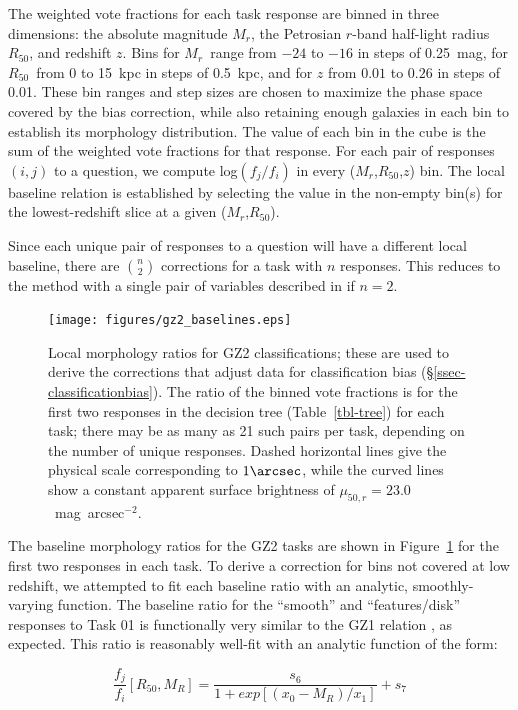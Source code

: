 \documentclass[useAMS,usenatbib]{mn2e}
\newcommand{\mr}{$M_r$}
\newcommand{\rfifty}{$R_{50}$}
\newcommand{\redshift}{$z$}
\begin{document}
The weighted vote fractions for each task response are binned in three dimensions: the absolute magnitude \mr, the Petrosian $r$-band half-light radius \rfifty, and redshift $z$. Bins for \mr~range from $-24$ to $-16$ in steps of 0.25~mag, for \rfifty~from 0 to 15~kpc in steps of 0.5~kpc, and for $z$ from $0.01$ to $0.26$ in steps of 0.01. These bin ranges and step sizes are chosen to maximize the phase space covered by the bias correction, while also retaining enough galaxies in each bin to establish its morphology distribution. The value of each bin in the cube is the sum of the weighted vote fractions for that response. For each pair of responses $(i,j)$ to a question, we compute log$(f_j/f_i)$ in every (\mr,\rfifty,\redshift) bin. The local baseline relation is established by selecting the value in the non-empty bin(s) for the lowest-redshift slice at a given (\mr,\rfifty). 

Since each unique pair of responses to a question will have a different local baseline, there are $\binom{n}{2}$ corrections for a task with $n$ responses. This reduces to the method with a single pair of variables described in \citet{bam09} if $n=2$. 

\begin{figure}
\texttt{[image: figures/gz2\_baselines.eps]}
\caption{Local morphology ratios for GZ2 classifications; these are used to derive the corrections that adjust data for classification bias (\S\ref{ssec-classificationbias}). The ratio of the binned vote fractions is for the first two responses in the decision tree (Table~\ref{tbl-tree}) for each task; there may be as many as 21 such pairs per task, depending on the number of unique responses. Dashed horizontal lines give the physical scale corresponding to $1\arcsec$, while the curved lines show a constant apparent surface brightness of $\mu_{50,r}=23.0$~mag~arcsec$^{-2}$.
\label{fig-baselines}}
\end{figure}

The baseline morphology ratios for the GZ2 tasks are shown in Figure~\ref{fig-baselines} for the first two responses in each task. To derive a correction for bins not covered at low redshift, we attempted to fit each baseline ratio with an analytic, smoothly-varying function. The baseline ratio for the ``smooth'' and ``features/disk'' responses to Task 01 is functionally very similar to the GZ1 relation \citep[Figure~A5 in ][]{bam09}, as expected. This ratio is reasonably well-fit with an analytic function of the form:

\begin{equation}
\frac{f_j}{f_i}[R_{50},M_R] = \frac{s_6}{1 + exp[(x_0 - M_R)/x_1]} + s_7
\label{eqn-sb}
\end{equation}
\end{document}
